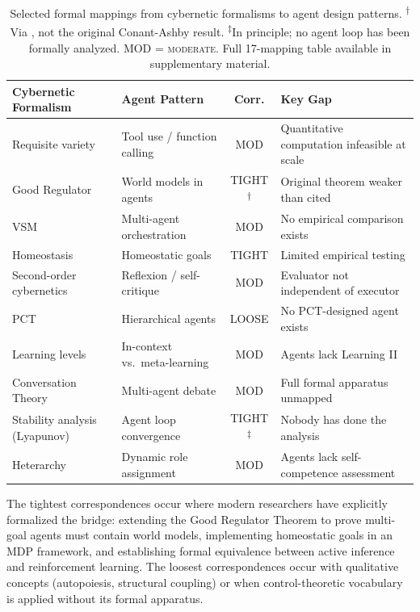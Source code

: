 \documentclass[11pt]{article}
\begin{document}
\begin{table}[t]
\centering
\small
\begin{tabular}{p{3.8cm}p{3.2cm}cp{4.2cm}}
\toprule
\textbf{Cybernetic Formalism} & \textbf{Agent Pattern} & \textbf{Corr.} & \textbf{Key Gap} \\
\midrule
Requisite variety \cite{ashby1956introduction} & Tool use / function calling & MOD & Quantitative computation infeasible at scale \\
Good Regulator \cite{conant1970every} & World models in agents & TIGHT\textsuperscript{$\dagger$} & Original theorem weaker than cited \\
VSM \cite{beer1972brain} & Multi-agent orchestration & MOD & No empirical comparison exists \\
Homeostasis \cite{ashby1952design} & Homeostatic goals \cite{pihlakas2024homeostasis} & TIGHT & Limited empirical testing \\
Second-order cybernetics & Reflexion / self-critique & MOD & Evaluator not independent of executor \\
PCT \cite{powers1973behavior} & Hierarchical agents & LOOSE & No PCT-designed agent exists \\
Learning levels \cite{bateson1972steps} & In-context vs.\ meta-learning & MOD & Agents lack Learning II \\
Conversation Theory \cite{pask1976conversation} & Multi-agent debate & MOD & Full formal apparatus unmapped \\
Stability analysis (Lyapunov) & Agent loop convergence & TIGHT\textsuperscript{$\ddagger$} & Nobody has done the analysis \\
Heterarchy \cite{mcculloch1945heterarchy} & Dynamic role assignment & MOD & Agents lack self-competence assessment \\
\bottomrule
\end{tabular}
\caption{Selected formal mappings from cybernetic formalisms to agent design patterns. \textsuperscript{$\dagger$}Via \citet{richens2025world}, not the original Conant-Ashby result. \textsuperscript{$\ddagger$}In principle; no agent loop has been formally analyzed. MOD = \textsc{moderate}. Full 17-mapping table available in supplementary material.}
\label{tab:mappings}
\end{table}

The tightest correspondences occur where modern researchers have explicitly formalized the bridge: \citet{richens2025world} extending the Good Regulator Theorem to prove multi-goal agents must contain world models, \citet{pihlakas2024homeostasis} implementing homeostatic goals in an MDP framework, and \citet{tschantz2020rl} establishing formal equivalence between active inference and reinforcement learning. The loosest correspondences occur with qualitative concepts (autopoiesis, structural coupling) or when control-theoretic vocabulary is applied without its formal apparatus.
\end{document}
